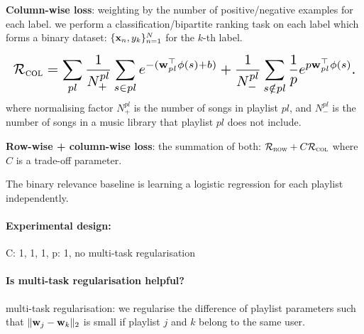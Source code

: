 {\bf Column-wise loss}: weighting by the number of positive/negative examples for each label.
\ie we perform a classification/bipartite ranking task on each label which forms a binary dataset:
$\{\mathbf{x}_n, y_k\}_{n=1}^N$ for the $k$-th label.

\begin{equation*}
\resizebox{\linewidth}{!}{$
\RCal_\textsc{col} 
= \displaystyle \sum_{pl}
  \frac{1}{N_+^{pl}} \sum_{s \in pl} e^{-(\w_{pl}^\top \phi(s) + b)} +
  \frac{1}{N_-^{pl}} \sum_{s \notin pl} \frac{1}{p} e^{p \w_{pl}^\top \phi(s)}.
$}
\end{equation*}
where normalising factor $N_+^{pl}$ is the number of songs in playlist $pl$,
and $N_-^{pl}$ is the number of songs in a music library that playlist $pl$ does not include.


{\bf Row-wise + column-wise loss}: the summation of both: $\mathcal{R}_\textsc{row} + C \mathcal{R}_\textsc{col}$ 
where $C$ is a trade-off parameter.

The binary relevance baseline is learning a logistic regression for each playlist independently.


\begin{table}[!h]
\centering
\caption{Empirical results}
\end{table}

\paragraph{Experimental design:}
C: 1, 1, 1, p: 1, no multi-task regularisation

\paragraph{Is multi-task regularisation helpful?}

multi-task regularisation: we regularise the difference of playlist parameters 
such that $\|\mathbf{w}_j - \mathbf{w}_k\|_2$ is small if playlist $j$ and $k$ belong to the same user.

